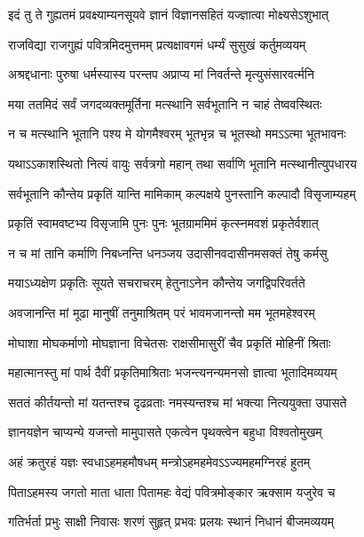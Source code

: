 \twolineshloka
{इदं तु ते गुह्यतमं प्रवक्ष्याम्यनसूयवे}
{ज्ञानं विज्ञानसहितं यज्ज्ञात्वा मोक्ष्यसेऽशुभात्}%

\twolineshloka
{राजविद्या राजगुह्यं पवित्रमिदमुत्तमम्}
{प्रत्यक्षावगमं धर्म्यं सुसुखं कर्तुमव्ययम्}%

\twolineshloka
{अश्रद्दधानाः पुरुषा धर्मस्यास्य परन्तप}
{अप्राप्य मां निवर्तन्ते मृत्युसंसारवर्त्मनि}%

\twolineshloka
{मया ततमिदं सर्वं जगदव्यक्तमूर्तिना}
{मत्स्थानि सर्वभूतानि न चाहं तेष्ववस्थितः}%

\twolineshloka
{न च मत्स्थानि भूतानि पश्य मे योगमैश्वरम्}
{भूतभृन्न च भूतस्थो ममऽऽत्मा भूतभावनः}%

\twolineshloka
{यथाऽऽकाशस्थितो नित्यं वायुः सर्वत्रगो महान्}
{तथा सर्वाणि भूतानि मत्स्थानीत्युपधारय}%

\twolineshloka
{सर्वभूतानि कौन्तेय प्रकृतिं यान्ति मामिकाम्}
{कल्पक्षये पुनस्तानि कल्पादौ विसृजाम्यहम्}%

\twolineshloka
{प्रकृतिं स्वामवष्टभ्य विसृजामि पुनः पुनः}
{भूतग्राममिमं कृत्स्नमवशं प्रकृतेर्वशात्}%

\twolineshloka
{न च मां तानि कर्माणि निबध्नन्ति धनञ्जय}
{उदासीनवदासीनमसक्तं तेषु कर्मसु}%

\twolineshloka
{मयाऽध्यक्षेण प्रकृतिः सूयते सचराचरम्}
{हेतुनाऽनेन कौन्तेय जगद्विपरिवर्तते}%

\twolineshloka
{अवजानन्ति मां मूढा मानुषीं तनुमाश्रितम्}
{परं भावमजानन्तो मम भूतमहेश्वरम्}%

\twolineshloka
{मोघाशा मोघकर्माणो मोघज्ञाना विचेतसः}
{राक्षसीमासुरीं चैव प्रकृतिं मोहिनीं श्रिताः}%

\twolineshloka
{महात्मानस्तु मां पार्थ दैवीं प्रकृतिमाश्रिताः}
{भजन्त्यनन्यमनसो ज्ञात्वा भूतादिमव्ययम्}%

\twolineshloka
{सततं कीर्तयन्तो मां यतन्तश्च दृढव्रताः}
{नमस्यन्तश्च मां भक्त्या नित्ययुक्ता उपासते}%

\twolineshloka
{ज्ञानयज्ञेन चाप्यन्ये यजन्तो मामुपासते}
{एकत्वेन पृथक्त्वेन बहुधा विश्वतोमुखम्}%

\twolineshloka
{अहं क्रतुरहं यज्ञः स्वधाऽहमहमौषधम्}
{मन्त्रोऽहमहमेवऽऽज्यमहमग्निरहं हुतम्}%

\twolineshloka
{पिताऽहमस्य जगतो माता धाता पितामहः}
{वेद्यं पवित्रमोङ्कार ऋक्साम यजुरेव च}%

\twolineshloka
{गतिर्भर्ता प्रभुः साक्षी निवासः शरणं सुहृत्}
{प्रभवः प्रलयः स्थानं निधानं बीजमव्ययम्}%

